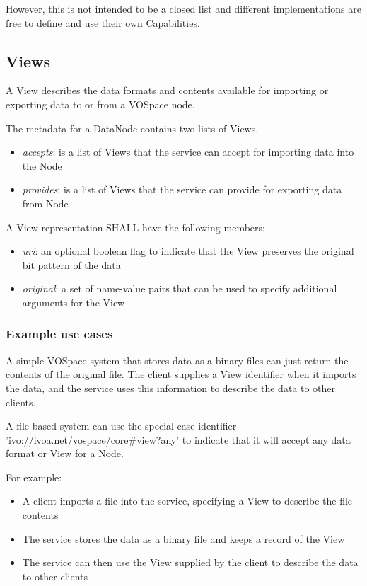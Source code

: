 \documentclass[11pt,a4paper]{ivoa}
\begin{document}
However, this is not intended to be a closed list and different implementations are free to define and use their own Capabilities.

\subsection{Views}
A View describes the data formats and contents available for importing or exporting data to or from a VOSpace node.

The metadata for a DataNode contains two lists of Views.

\begin{itemize}
    \item \emph{accepts}: is a list of Views that the service can accept for importing data into the Node
    \item \emph{provides}: is a list of Views that the service can provide for exporting data from Node
\end{itemize}

A View representation SHALL have the following members:

\begin{itemize}
    \item \emph{uri}: an optional boolean flag to indicate that the View preserves the original bit pattern of the data
    \item \emph{original}: a set of name-value pairs that can be used to specify additional arguments for the View
\end{itemize}

\subsubsection{Example use cases}
A simple VOSpace system that stores data as a binary files can just return the contents of the original file. The client supplies a View identifier when it imports the data, and the service uses this information to describe the data to other clients.

A file based system can use the special case identifier 'ivo://ivoa.net/vospace/core\#view?any' to indicate that it will accept any data format or View for a Node.

For example:

\begin{itemize}
    \item A client imports a file into the service, specifying a View to describe the file contents
    \item The service stores the data as a binary file and keeps a record of the View
    \item The service can then use the View supplied by the client to describe the data to other clients
\end{itemize}
\end{document}
